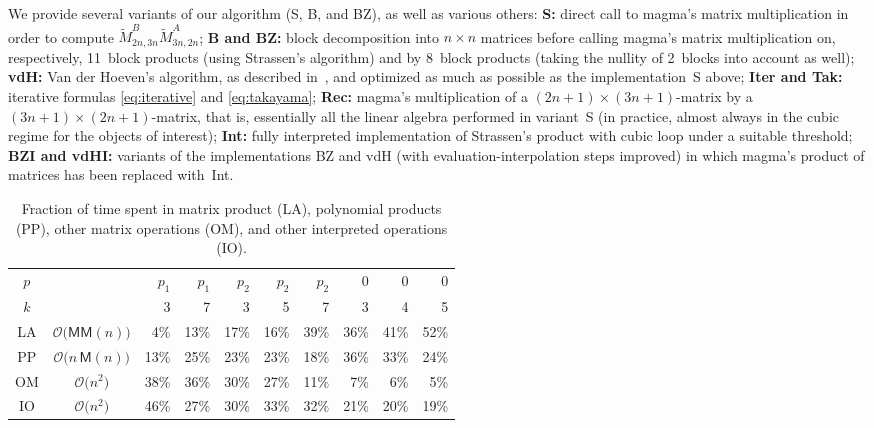 \documentclass{sig-alt-full}
\newcommand{\bigO}{{\mathcal{O}}}
\newcommand{\MM}{\mathsf{MM}}
\newcommand{\sM}{\mathsf{M}}
\def\tM{\tilde M}
\begin{document}
We provide several variants of our algorithm (S, B, and BZ), as well as various others:
{\bf S:}
direct call to \textsf{magma}'s matrix multiplication in order to compute
$\tM^B_{2n,3n} \tM^A_{3n,2n}$;
{\bf B and BZ:}
block decomposition into $n\times n$ matrices before calling \textsf{magma}'s  matrix multiplication on, respectively, 11~block products (using Strassen's algorithm) and by 8~block products (taking the nullity of 2~blocks into account as well);
{\bf vdH:}
Van der Hoeven's algorithm, as described in~\cite{vdHoeven02}, and optimized as much as possible as the implementation~S above;
{\bf Iter and Tak:}
iterative formulas \eqref{eq:iterative} and \eqref{eq:takayama};
{\bf Rec:}
\textsf{magma}'s multiplication of a $(2n+1)\times(3n+1)$-matrix by a $(3n+1)\times(2n+1)$-matrix, that is, essentially all the linear algebra performed in variant~S (in practice, almost always in the cubic regime for the objects of interest);
{\bf Int:}
fully interpreted implementation of Strassen's product with cubic loop under a suitable threshold;
{\bf BZI and vdHI:}
variants of the implementations BZ and vdH (with evaluation-interpolation steps improved) in which \textsf{magma}'s product of matrices has been replaced with~Int.

\begin{table}[ht]
\begin{small}
\begin{center}
\setlength{\tabcolsep}{2.5pt}
\begin{tabular}{cc|rr|rrr|rrr}
$p$& & $p_1$& $p_1$& $p_2$& $p_2$& $p_2$&    0 &    0 &    0 \\
$k$& &    3 &    7 &    3 &    5 &    7 &    3 &    4 &    5 \\
\hline
LA & $\bigO\bigl(\MM(n)\bigr)$ &  4\% & 13\% & 17\% & 16\% & 39\% & 36\% & 41\% & 52\% \\
PP & $\bigO\bigl(n\,\sM(n)\bigr)$ & 13\% & 25\% & 23\% & 23\% & 18\% & 36\% & 33\% & 24\% \\
OM & $\bigO\bigl(n^2\bigr)$ & 38\% & 36\% & 30\% & 27\% & 11\% &  7\% &  6\% &  5\% \\
IO & $\bigO\bigl(n^2\bigr)$ & 46\% & 27\% & 30\% & 33\% & 32\% & 21\% & 20\% & 19\%
\end{tabular}
\caption{\label{table:percentages}Fraction of time spent in matrix product (LA), polynomial products (PP), other matrix operations (OM), and other interpreted operations (IO).}
\end{center}
\end{small}
\end{table}
\vskip-7pt
\end{document}
